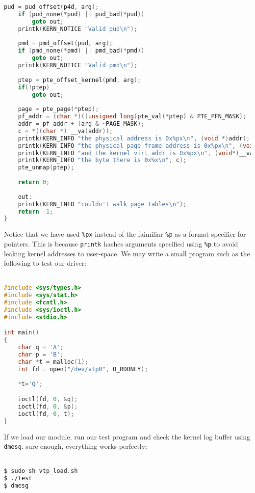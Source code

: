 \documentclass[a4paper,10pt]{article}
\begin{document}
\begin{flushleft}
\begin{lstlisting}[caption={Our ioctl function},label={lst:vtp_ioctl},language=C, style=mystyle]
	pud = pud_offset(p4d, arg);
	if (pud_none(*pud) || pud_bad(*pud))
		goto out;
	printk(KERN_NOTICE "Valid pud\n");
	
	pmd = pmd_offset(pud, arg);
	if (pmd_none(*pmd) || pmd_bad(*pmd))
		goto out;
	printk(KERN_NOTICE "Valid pmd\n");
	
	ptep = pte_offset_kernel(pmd, arg);
	if(!ptep)
		goto out;
	
	page = pte_page(*ptep);
	pf_addr = (char *)((unsigned long)pte_val(*ptep) & PTE_PFN_MASK);
	addr = pf_addr + (arg & ~PAGE_MASK);
	c = *((char *) __va(addr));
	printk(KERN_INFO "the physical address is 0x%px\n", (void *)addr);
	printk(KERN_INFO "the physical page frame address is 0x%px\n", (void *)pf_addr);
	printk(KERN_INFO "and the kernel virt addr is 0x%px\n", (void*)__va(addr));
	printk(KERN_INFO "the byte there is 0x%x\n", c);
	pte_unmap(ptep);
	
	return 0;
	
	out:
	printk(KERN_INFO "couldn't walk page tables\n");
	return -1;
}
\end{lstlisting}

Notice that we have used \verb|%px| instead of the faimiliar \verb|%p| as a format specifier for pointers. This is because \verb|printk| hashes 
arguments specified using \verb|%p| to avoid leaking kernel addresses to user-space. We may write a small program such as the following to test our
driver: \\~\\

\begin{lstlisting}[language=C, style=mystyle]
#include <sys/types.h>
#include <sys/stat.h>
#include <fcntl.h>
#include <sys/ioctl.h>
#include <stdio.h>

int main()
{
	char q = 'A';
	char p = 'B';
	char *t = malloc(1);
	int fd = open("/dev/vtp0", O_RDONLY);
	
	*t='Q';

	ioctl(fd, 0, &q);
	ioctl(fd, 0, &p);
	ioctl(fd, 0, t);
}
\end{lstlisting}

If we load our module, run our test program and check the kernel log buffer using \verb|dmesg|, sure enough, everything works perfectly:\\~\\

\begin{lstlisting}[language=sh, backgroundcolor=\color{backcolour}, basicstyle=\ttfamily\footnotesize]
$ sudo sh vtp_load.sh
$ ./test
$ dmesg


\end{lstlisting}
\end{flushleft}
\end{document}

